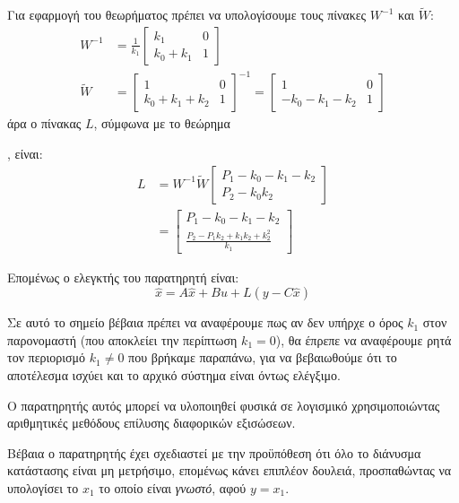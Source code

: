 \documentclass[11pt,a4paper,notitlepage,fleqn]{article}
\let\mytodo\todo
\renewcommand{\todo}[1]{\par\mytodo[inline,noline]{#1}}
\begin{document}
\begin{exercise}
	Για εφαρμογή του θεωρήματος πρέπει να υπολογίσουμε τους πίνακες
	\( W^{-1} \) και \( \tilde W \):
	\begin{align*}
		W^{-1} &= \frac{1}{k_1} \left[\begin{matrix}
		k_1 & 0 \\ k_0 + k_1 & 1
		\end{matrix}\right]
		\\
		\tilde W &= \left[\begin{matrix}
		1 & 0 \\ k_0+k_1+k_2 & 1
		\end{matrix}\right]^{-1} = \left[\begin{matrix}
		1 & 0 \\ -k_0-k_1-k_2 & 1
		\end{matrix}\right]
	\end{align*}
	άρα ο πίνακας \( L \), σύμφωνα με το θεώρημα \todo{τάδε}, είναι:
	\begin{align*}
	L &= W^{-1} \tilde W \left[\begin{matrix}
	P_1 - k_0 - k_1 - k_2 \\ P_2 - k_0 k_2
	\end{matrix}\right]
	\\ &= \left[\begin{matrix}
	P_1 - k_0 - k_1 - k_2 \\
	\frac{P_2 - P_1k_2 + k_1k_2 + k_2^2}{k_1}
	\end{matrix}\right]
	\end{align*}
	
	Επομένως ο ελεγκτής του παρατηρητή είναι:
	\[
	\hat x = A\hat x + Bu + L(y-C\hat x)
	\]
	
	Σε αυτό το σημείο βέβαια πρέπει να αναφέρουμε πως αν δεν υπήρχε ο
	όρος \( k_1 \) στον παρονομαστή (που αποκλείει την περίπτωση
	\( k_1 = 0 \)), θα έπρεπε να αναφέρουμε ρητά τον περιορισμό
	\( k_1 \neq 0 \) που βρήκαμε παραπάνω, για να βεβαιωθούμε ότι το
	αποτέλεσμα ισχύει και το αρχικό σύστημα είναι όντως ελέγξιμο.
	
	Ο παρατηρητής αυτός μπορεί να υλοποιηθεί φυσικά σε λογισμικό χρησιμοποιώντας
	αριθμητικές μεθόδους επίλυσης διαφορικών εξισώσεων.
	
	Βέβαια ο παρατηρητής έχει σχεδιαστεί με την προϋπόθεση ότι όλο
	το διάνυσμα κατάστασης είναι μη μετρήσιμο, επομένως κάνει επιπλέον
	δουλειά, προσπαθώντας να υπολογίσει το \( x_1 \) το οποίο είναι
	\textit{γνωστό}, αφού \( y = x_1 \).
\end{exercise}
\end{document}
